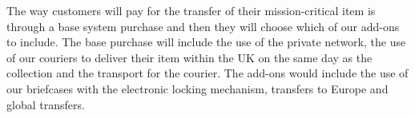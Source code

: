 The way customers will pay for the transfer of their mission-critical item is through a base system purchase and then they will choose which of our add-ons to include. The base purchase will include the use of the private network, the use of our couriers to deliver their item within the UK on the same day as the collection and the transport for the courier. The add-ons would include the use of our briefcases with the electronic locking mechanism, transfers to Europe and global transfers. 
